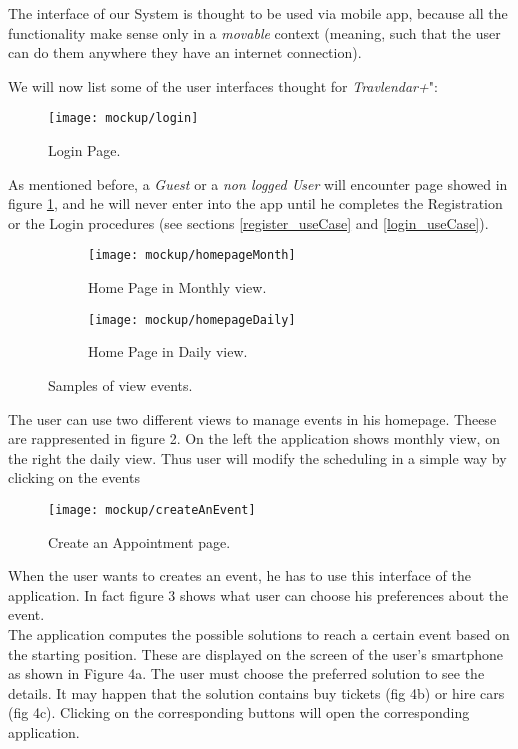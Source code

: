 The interface of our System is thought to be used via mobile app, because all the functionality make sense only in a \textit{movable} context (meaning, such that the user can do them anywhere they have an internet connection).

We will now list some of the user interfaces thought for \textit{Travlendar+}":

\begin{figure}[h]
	\texttt{[image: mockup/login]}
	\centering
	\caption{Login Page.}
	\label{fig:login}
\end{figure}
As mentioned before, a \textit{Guest} or a \textit{non logged User} will encounter page showed in figure \ref{fig:login}, and he will never enter into the app until he completes the Registration or the Login procedures (see sections \ref{register_useCase} and \ref{login_useCase}).

\begin{figure}[H]
	\begin{subfigure}{0.5\textwidth}
		\texttt{[image: mockup/homepageMonth]} 
		\centering
		\caption{Home Page in Monthly view.}
		\label{fig:homePage_Month}
	\end{subfigure}
	\begin{subfigure}{0.5\textwidth}
		\texttt{[image: mockup/homepageDaily]} 
		\centering
		\caption{Home Page in Daily view.}
		\label{fig:homePage_Day}
	\end{subfigure}
	\caption{Samples of view events.}
\end{figure}
The user can use two different views to manage events in his homepage. Theese are rappresented in figure 2. On the left the application shows monthly view, on the right the daily view. Thus user will modify the scheduling in a simple way by clicking on the events

\begin{figure}[H]
	\texttt{[image: mockup/createAnEvent]}
	\centering
	\caption{Create an Appointment page.}
	\label{fig:createEvent}
\end{figure}
When the user wants to creates an event, he has to use this interface of the application. In fact figure 3 shows what user can choose his preferences about the event.\\

The application computes the possible solutions to reach a certain event based on the starting position. These are displayed on the screen of the user's smartphone as shown in Figure 4a. The user must choose the preferred solution to see the details. It may happen that the solution contains buy tickets (fig 4b) or hire cars (fig 4c). Clicking on the corresponding buttons will open the corresponding application.

